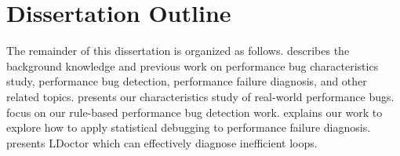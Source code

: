\section{Dissertation Outline}
The remainder of this dissertation is organized as follows. 
 describes the background knowledge and previous work on performance bug characteristics study, performance bug detection, performance failure diagnosis, and other related topics. 
 presents our characteristics study of real-world performance bugs. 
 focus on our rule-based performance bug detection work. 
 explains our work to explore how to apply statistical debugging to performance failure diagnosis. 
 presents LDoctor which can effectively diagnose inefficient loops. 
